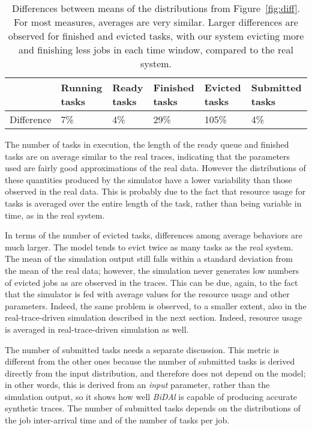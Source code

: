 \documentclass{article}
\begin{document}
\begin{table}[b]
\begin{tabular}{p{1.7cm} p{1.5cm} p{1.5cm} p{1.5cm} p{1.5cm} p{1.5cm}}
\hline &Running tasks & Ready tasks  &Finished tasks & Evicted tasks& Submitted tasks   \\
\hline\hline
Difference & 7\% & 4\% & 29\% & 105\% & 4\%\\ 
\hline
\end{tabular}
\caption{Differences between means of the distributions from Figure~\ref{fig:diff}. For most measures, averages are very similar. Larger differences are observed for finished and evicted tasks, with our system evicting more and finishing less jobs in each time window, compared to the real system.}
\label{tab:diff}     
\end{table}

The number of tasks in execution, the length of the ready queue and finished tasks are on average similar to the real traces, indicating that the parameters used are fairly good approximations of the real data. However the distributions of these quantities produced by the simulator have a lower variability than those observed in the real data. This is probably due to the fact that resource usage for tasks is averaged over the entire length of the task, rather than being variable in time, as in the real system.

In terms of the number of evicted tasks, differences among average behaviors are much larger. The model tends to evict twice as many tasks as the real system. The mean of the simulation output still falls within a standard deviation from the mean of the real data; however, the simulation never generates low numbers of evicted jobs as are observed in the traces. This can be due, again, to the fact that the simulator is fed with average values for the resource usage and other parameters. Indeed, the same problem is observed, to a smaller extent, also in the real-trace-driven simulation described in the next section. Indeed, resource usage is averaged in real-trace-driven simulation as well.

The number of submitted tasks needs a separate discussion. This metric is different from the other ones because the number of submitted tasks is derived directly from the input distribution, and therefore does not depend on the model; in other words, this is derived from an \emph{input} parameter, rather than the simulation output, so it shows how well \emph{BiDAl} is capable of producing accurate synthetic traces. The number of submitted tasks depends on the distributions of the job inter-arrival time and of the number of tasks per job. 
\end{document}
